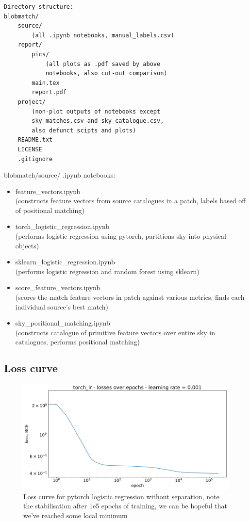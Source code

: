 \documentclass[12pt,a4paper]{article}
\begin{document}
\begin{verbatim}
Directory structure:
blobmatch/
    source/
        (all .ipynb notebooks, manual_labels.csv)
    report/
        pics/
            (all plots as .pdf saved by above
            notebooks, also cut-out comparison)
        main.tex
        report.pdf
    project/
        (non-plot outputs of notebooks except
        sky_matches.csv and sky_catalogue.csv,
        also defunct scipts and plots)
    README.txt
    LICENSE
    .gitignore
\end{verbatim}

blobmatch/source/ .ipynb notebooks:
\begin{itemize}
    \item feature\_vectors.ipynb\\
(constructs feature vectors from source catalogues in a patch, labels based off of positional matching)

    \item torch\_logistic\_regression.ipynb\\
(performs logistic regression using pytorch, partitions sky into physical objects)

    \item sklearn\_logistic\_regression.ipynb\\
(performs logistic regression and random forest using sklearn)

    \item score\_feature\_vectors.ipynb\\
(scores the match feature vectors in patch against various metrics, finds each individual source's best match)

    \item sky\_positional\_matching.ipynb\\
(constructs catalogue of primitive feature vectors over entire sky in catalogues, performs positional matching)
\end{itemize}

\subsection{Loss curve}
\label{app:losses}
\begin{figure}[H]
    \centering
    \includegraphics[width=\textwidth]{pics/torch_lr_losses_nosep.pdf}
    \caption{Loss curve for pytorch logistic regression without separation, note the stabilisation after 1e5 epochs of training, we can be hopeful that we've reached some local minimum}
    \label{fig:torch_lr_losses_nosep}
\end{figure}
\end{document}
